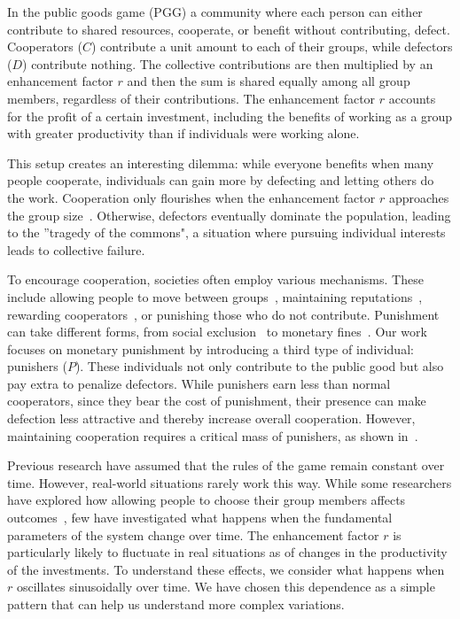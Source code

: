 In the public goods game (PGG) a community where each person can either contribute to shared resources, cooperate, or benefit without contributing, defect. Cooperators ($C$) contribute a unit amount to each of their groups, while defectors ($D$) contribute nothing. The collective contributions are then multiplied by an enhancement factor $r$ and then the sum is shared equally among all group members, regardless of their contributions. The enhancement factor $r$ accounts for the profit of a certain investment, including the benefits of working as a group with greater productivity than if individuals were working alone.

This setup creates an interesting dilemma: while everyone benefits when many people cooperate, individuals can gain more by defecting and letting others do the work. Cooperation only flourishes when the enhancement factor $r$ approaches the group size~\cite{r/G}. Otherwise, defectors eventually dominate the population, leading to the ''tragedy of the commons", a situation where pursuing individual interests leads to collective failure.


To encourage cooperation, societies often employ various mechanisms. These include allowing people to move between groups~\cite{Migration}, maintaining reputations~\cite{Reputation}, rewarding cooperators~\cite{Reward}, or punishing those who do not contribute. Punishment can take different forms, from social exclusion~\cite{SocialExclusion} to monetary fines~\cite{Punish2}. Our work focuses on monetary punishment by introducing a third type of individual: punishers ($P$). These individuals not only contribute to the public good but also pay extra to penalize defectors. While punishers earn less than normal cooperators, since they bear the cost of punishment, their presence can make defection less attractive and thereby increase overall cooperation. However, maintaining cooperation requires a critical mass of punishers, as shown in~\cite{SocialExclusion}.


Previous research have assumed that the rules of the game remain constant over time. However, real-world situations rarely work this way. While some researchers have explored how allowing people to choose their group members affects outcomes~\cite{EdgeRule}, few have investigated what happens when the fundamental parameters of the system change over time. The enhancement factor $r$ is particularly likely to fluctuate in real situations as of changes in the productivity of the investments. To understand these effects, we consider what happens when $r$ oscillates sinusoidally over time. We have chosen this dependence as a simple pattern that can help us understand more complex variations. 

